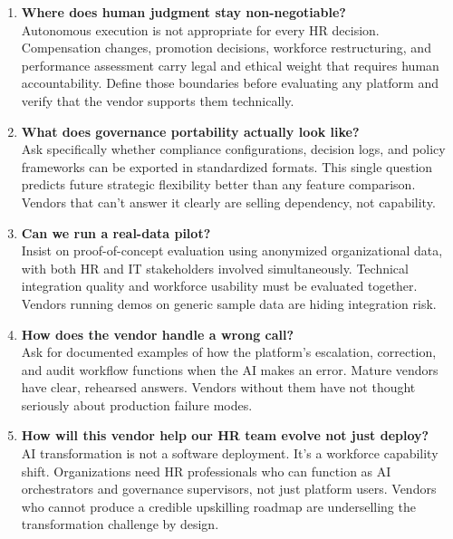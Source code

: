 \documentclass[12pt, a4paper]{article}
\begin{document}
\begin{enumerate}[leftmargin=1.4em, itemsep=6pt]

\item \textbf{Where does human judgment stay non-negotiable?} \\
  Autonomous execution is not appropriate for every HR decision. Compensation changes,
  promotion decisions, workforce restructuring, and performance assessment carry legal
  and ethical weight that requires human accountability. Define those boundaries before
  evaluating any platform and verify that the vendor supports them technically.

\item \textbf{What does governance portability actually look like?} \\
  Ask specifically whether compliance configurations, decision logs, and policy frameworks
  can be exported in standardized formats. This single question predicts future strategic
  flexibility better than any feature comparison. Vendors that can't answer it clearly
  are selling dependency, not capability.

\item \textbf{Can we run a real-data pilot?} \\
  Insist on proof-of-concept evaluation using anonymized organizational data, with both
  HR and IT stakeholders involved simultaneously. Technical integration quality and
  workforce usability must be evaluated together. Vendors running demos on generic
  sample data are hiding integration risk.

\item \textbf{How does the vendor handle a wrong call?} \\
  Ask for documented examples of how the platform's escalation, correction, and audit
  workflow functions when the AI makes an error. Mature vendors have clear, rehearsed
  answers. Vendors without them have not thought seriously about production failure modes.

\item \textbf{How will this vendor help our HR team evolve not just deploy?} \\
  AI transformation is not a software deployment. It's a workforce capability shift.
  Organizations need HR professionals who can function as AI orchestrators and governance
  supervisors, not just platform users. Vendors who cannot produce a credible upskilling
  roadmap are underselling the transformation challenge by design.

\end{enumerate}
\end{document}
